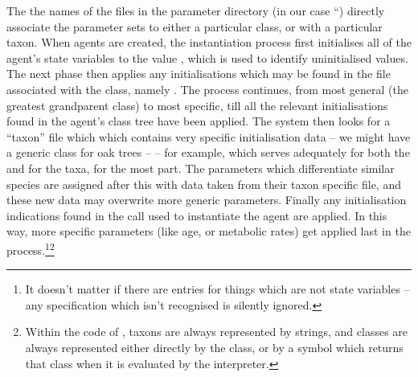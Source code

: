 The the names of the files in the parameter directory (in our case
``) directly associate the parameter sets to
either a particular class, or with a particular taxon.  When agents
are created, the instantiation process first initialises all of the
agent's state variables to the value , which is used
to identify uninitialised values.  The next phase then applies any
initialisations which may be found in the file associated with
the  class, namely .  The
process continues, from most general (the greatest grandparent class)
to most specific, till all the relevant initialisations found in the
agent's class tree have been applied.  The system then looks for a
``taxon'' file which which contains very specific initialisation data
-- we might have a generic class for oak trees --  --
for example, which serves adequately for both the  and
for the  taxa, for the most part. The parameters
which differentiate similar species are assigned after this with data
taken from their taxon specific file, and these new data may overwrite
more generic parameters.  Finally any initialisation indications found
in the  call used to instantiate the agent are
applied.  In this way, more specific parameters (like age, or
metabolic rates) get applied last in the process.\footnote{It doesn't
matter if there are entries for things which are not state variables
-- any specification which isn't recognised is silently
ignored.}\footnote{Within the code of \ReModel, taxons are always
represented by strings, and classes are always represented either
directly by the class, or by a symbol which returns that class when it
is evaluated by the interpreter.}

